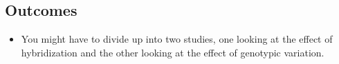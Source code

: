 \documentclass[12pt]{article}
\begin{document}
\subsection{Outcomes}
\begin{itemize}
\item You might have to divide up into two studies, one looking at
  the effect of hybridization and the other looking at the effect of
  genotypic variation.
\end{itemize}


\end{document}

